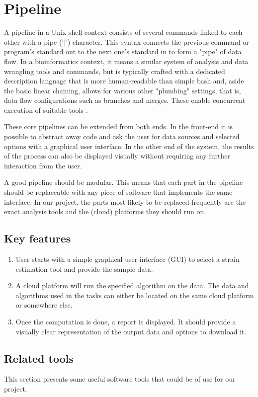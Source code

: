\documentclass{report}
\begin{document}
\section {Pipeline}
A pipeline in a Unix shell context consists of several commands linked to each other with a pipe ('$|$') character. This syntax connects the previous command or program's standard out to the next one's standard in to form a "pipe" of data flow. In a bioinformatics context, it means a similar system of analysis and data wrangling tools and commands, but is typically crafted with a dedicated description language that is more human-readable than simple bash and, aside the basic linear chaining, allows for various other "plumbing" settings, that is, data flow configurations such as branches and merges. These enable concurrent execution of suitable tools \cite{wdl}.

These core pipelines can be extended from both ends. In the front-end it is possible to abstract away code and ask the user for data sources and selected options with a graphical user interface. In the other end of the system, the results of the process can also be displayed visually without requiring any further interaction from the user.

A good pipeline should be modular. This means that each part in the pipeline should be replaceable with any piece of software that implements the same interface. In our project, the parts most likely to be replaced frequently are the exact analysis tools and the (cloud) platforms they should run on.


\subsection{Key features}
\begin{enumerate}
    \item User starts with a simple graphical user interface (GUI) to select a strain estimation tool and provide the sample data.
    \item A cloud platform will run the specified algorithm on the data. The data and algorithms used in the tasks can either be located on the same cloud platform or somewhere else.
    \item Once the computation is done, a report is displayed. It should provide a visually clear representation of the output data and options to download it.
\end{enumerate}


\subsection{Related tools}
This section presents some useful software tools that could be of use for our project. 
\end{document}
